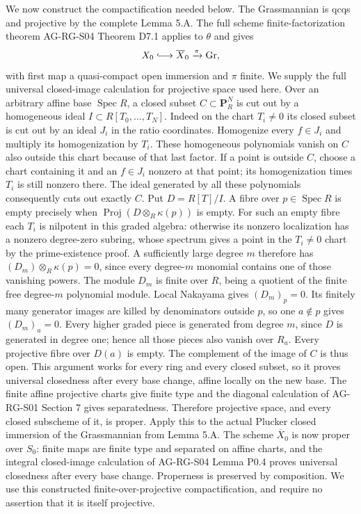 \documentclass[11pt,a4paper,openany]{report}
\begin{document}
We now construct the compactification needed below. The Grassmannian is qcqs and projective by the complete Lemma 5.A. The full scheme finite-factorization theorem AG-RG-S04 Theorem D7.1 applies to \(\theta\) and gives \[
 X_0\lhook\joinrel\longrightarrow\overline X_0
                \xrightarrow{\pi}\operatorname{Gr},
\] with first map a quasi-compact open immersion and \(\pi\) finite. We supply the full universal closed-image calculation for projective space used here. Over an arbitrary affine base \(\operatorname{Spec}R\), a closed subset \(C\subset\mathbf P_R^N\) is cut out by a homogeneous ideal \(I\subset R[T_0,\ldots,T_N]\). Indeed on the chart \(T_i\ne0\) its closed subset is cut out by an ideal \(J_i\) in the ratio coordinates. Homogenize every \(f\in J_i\) and multiply its homogenization by \(T_i\). These homogeneous polynomials vanish on \(C\) also outside this chart because of that last factor. If a point is outside \(C\), choose a chart containing it and an \(f\in J_i\) nonzero at that point; its homogenization times \(T_i\) is still nonzero there. The ideal generated by all these polynomials consequently cuts out exactly \(C\). Put \(D=R[T]/I\). A fibre over \(p\in\operatorname{Spec}R\) is empty precisely when \(\operatorname{Proj}(D\otimes_R\kappa(p))\) is empty. For such an empty fibre each \(T_i\) is nilpotent in this graded algebra: otherwise its nonzero localization has a nonzero degree-zero subring, whose spectrum gives a point in the \(T_i\ne0\) chart by the prime-existence proof. A sufficiently large degree \(m\) therefore has \((D_m)\otimes_R\kappa(p)=0\), since every degree-\(m\) monomial contains one of those vanishing powers. The module \(D_m\) is finite over \(R\), being a quotient of the finite free degree-\(m\) polynomial module. Local Nakayama gives \((D_m)_p=0\). Its finitely many generator images are killed by denominators outside \(p\), so one \(a\notin p\) gives \((D_m)_a=0\). Every higher graded piece is generated from degree \(m\), since \(D\) is generated in degree one; hence all those pieces also vanish over \(R_a\). Every projective fibre over \(D(a)\) is empty. The complement of the image of \(C\) is thus open. This argument works for every ring and every closed subset, so it proves universal closedness after every base change, affine locally on the new base. The finite affine projective charts give finite type and the diagonal calculation of AG-RG-S01 Section 7 gives separatedness. Therefore projective space, and every closed subscheme of it, is proper. Apply this to the actual Plucker closed immersion of the Grassmannian from Lemma 5.A. The scheme \(\overline X_0\) is now proper over \(S_0\): finite maps are finite type and separated on affine charts, and the integral closed-image calculation of AG-RG-S04 Lemma P0.4 proves universal closedness after every base change. Properness is preserved by composition. We use this constructed finite-over-projective compactification, and require no assertion that it is itself projective.
\end{document}
